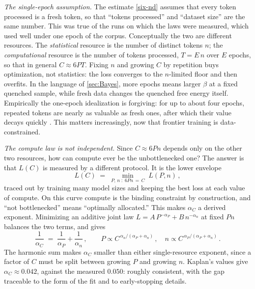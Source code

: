\documentclass[11pt]{article}
\begin{document}
\emph{The single-epoch assumption.} The estimate \eqref{six-nd} assumes that every token processed is a fresh token, so that ``tokens processed'' and ``dataset size'' are the same number. This was true of the runs on which the laws were measured, which used well under one epoch of the corpus. Conceptually the two are different resources. The \emph{statistical} resource is the number of distinct tokens $n$; the \emph{computational} resource is the number of tokens processed, $T = E\,n$ over $E$ epochs, so that in general $C\approx 6PT$. Fixing $n$ and growing $C$ by repetition buys optimization, not statistics: the loss converges to the $n$-limited floor and then overfits. In the language of \cref{sec:Bayes}, more epochs means larger $\beta$ at a fixed quenched sample, while fresh data changes the quenched free energy itself. Empirically the one-epoch idealization is forgiving: for up to about four epochs, repeated tokens are nearly as valuable as fresh ones, after which their value decays quickly \cite{muennighoff2023scaling}. This matters increasingly, now that frontier training is data-constrained.

\emph{The compute law is not independent.} Since $C\approx 6Pn$ depends only on the other two resources, how can compute ever be the unbottlenecked one? The answer is that $L(C)$ is measured by a different protocol. It is the lower envelope
%
\begin{equation} \label{compute-envelope}
    L(C) \;=\; \min_{P,\,n\;:\;6Pn\,=\,C}\; L(P, n)\,,
\end{equation}
%
traced out by training many model sizes and keeping the best loss at each value of compute. On this curve compute is the binding constraint by construction, and ``not bottlenecked'' means ``optimally allocated.'' This makes $\alpha_C$ a derived exponent. Minimizing an additive joint law $L = A\,P^{-\alpha_P} + B\,n^{-\alpha_n}$ at fixed $Pn$ balances the two terms, and gives
%
\begin{equation} \label{harmonic}
    \frac{1}{\alpha_C} \;=\; \frac{1}{\alpha_P} + \frac{1}{\alpha_n}\,,
    \qquad
    P \propto C^{\,\alpha_n/(\alpha_P + \alpha_n)}\,,\quad
    n \propto C^{\,\alpha_P/(\alpha_P + \alpha_n)}\,.
\end{equation}
%
The harmonic sum makes $\alpha_C$ smaller than either single-resource exponent, since a factor of $C$ must be split between growing $P$ and growing $n$. Kaplan's values give $\alpha_C\approx 0.042$, against the measured $0.050$: roughly consistent, with the gap traceable to the form of the fit and to early-stopping details.
\end{document}
